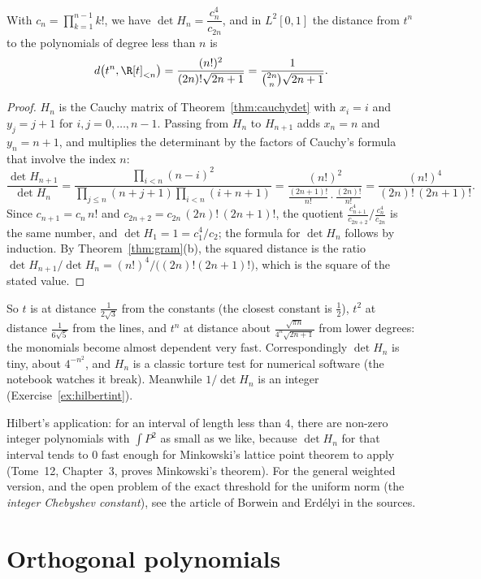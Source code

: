 \begin{corollary}\label{cor:hilbert}
With $c_n=\prod_{k=1}^{n-1}k!$, we have $\det H_n=\dfrac{c_n^4}{c_{2n}}$, and in $L^2[0,1]$ the distance from $t^n$ to the
polynomials of degree less than $n$ is
\[
d\bigl(t^n,\R[t]_{<n}\bigr)=\frac{(n!)^2}{(2n)!\sqrt{2n+1}}=\frac1{\binom{2n}n\sqrt{2n+1}}.
\]
\end{corollary}
\begin{proof}
$H_n$ is the Cauchy matrix of Theorem~\ref{thm:cauchydet} with $x_i=i$ and $y_j=j+1$ for $i,j=0,\dots,n-1$.
Passing from $H_n$ to $H_{n+1}$ adds $x_n=n$ and $y_n=n+1$, and multiplies the determinant by the factors of Cauchy's
formula that involve the index $n$:
\[
\frac{\det H_{n+1}}{\det H_n}=\frac{\prod_{i<n}(n-i)^2}{\prod_{j\le n}(n+j+1)\prod_{i<n}(i+n+1)}
=\frac{(n!)^2}{\frac{(2n+1)!}{n!}\cdot\frac{(2n)!}{n!}}=\frac{(n!)^4}{(2n)!\,(2n+1)!}.
\]
Since $c_{n+1}=c_n\,n!$ and $c_{2n+2}=c_{2n}\,(2n)!\,(2n+1)!$, the quotient $\frac{c_{n+1}^4}{c_{2n+2}}\big/\frac{c_n^4}{c_{2n}}$
is the same number, and $\det H_1=1=c_1^4/c_2$; the formula for $\det H_n$ follows by induction. By Theorem~\ref{thm:gram}(b), the squared distance is the ratio
$\det H_{n+1}/\det H_n=(n!)^4/\bigl((2n)!(2n+1)!\bigr)$, which is the square of the stated value.
\end{proof}

So $t$ is at distance $\frac1{2\sqrt3}$ from the constants (the closest constant is $\frac12$), $t^2$ at distance
$\frac1{6\sqrt5}$ from the lines, and $t^n$ at distance about $\frac{\sqrt{\pi n}}{4^n\sqrt{2n+1}}$ from lower degrees: the
monomials become almost dependent very fast. Correspondingly $\det H_n$ is tiny, about $4^{-n^2}$, and $H_n$ is a
classic torture test for numerical software (the notebook watches it break). Meanwhile $1/\det H_n$ is an integer
(Exercise~\ref{ex:hilbertint}).

\begin{remark}
Hilbert's application: for an interval of length less than $4$, there are non-zero integer polynomials with
$\int P^2$ as small as we like, because $\det H_n$ for that interval tends to $0$ fast enough for Minkowski's lattice point
theorem to apply (Tome~12, Chapter~3, proves Minkowski's theorem). For the general weighted version, and the open problem
of the exact threshold for the uniform norm (the \emph{integer Chebyshev constant}), see the article of Borwein and
Erd\'elyi in the sources.
\end{remark}

\section{Orthogonal polynomials}

